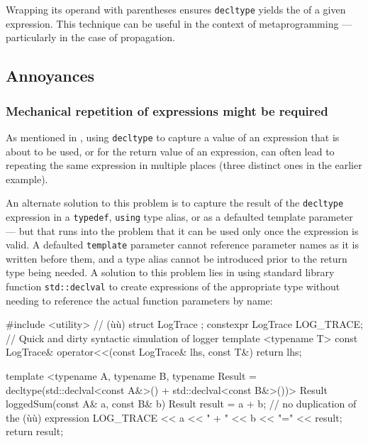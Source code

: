 \noindent Wrapping its operand with parentheses ensures \lstinline!decltype! yields
the  of a given expression. This technique can be
useful in the context of metaprogramming --- particularly in the case of
 propagation.

\subsection[Annoyances]{Annoyances}\label{annoyances-decltype}

\subsubsection{Mechanical repetition of expressions might be required}\label{decltype-mechanical}

As mentioned in
,
using \lstinline!decltype! to capture a value of an expression that is about to be used, or for the return value of an expression, can often lead to repeating the same expression in multiple places (three distinct ones in the earlier example).

An alternate solution to this problem is to capture the result of the \lstinline!decltype! expression in a \lstinline!typedef!, \lstinline!using! type alias, or as a defaulted template parameter --- but that runs into the problem that it can be used only once the expression is valid.  A defaulted \lstinline!template! parameter cannot reference parameter names as it is written before them, and a type alias cannot be introduced prior to the return type being needed.  A solution to this problem lies in using standard library function \lstinline!std::declval! to create expressions of the appropriate type without needing to reference the actual function parameters by name:

\begin{emcppshiddenlisting}[emcppsbatch=e11]
#include <utility>  // (ù{}ù)
struct LogTrace {};
constexpr LogTrace LOG_TRACE; // Quick and dirty syntactic simulation of logger
template <typename T>
const LogTrace& operator<<(const LogTrace& lhs, const T&) { return lhs; }
\end{emcppshiddenlisting}
\begin{emcppslisting}[emcppsbatch=e11]
template <typename A, typename B,
          typename Result = decltype(std::declval<const A&>() +
                                     std::declval<const B&>())>
Result loggedSum(const A& a, const B& b)
{
    Result result = a + b;  // no duplication of the (ù{}ù) expression
    LOG_TRACE << a << " + " << b << "=" << result;
    return result;
}
\end{emcppslisting}

